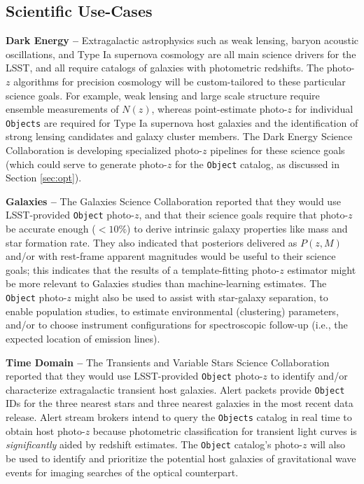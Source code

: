 \documentclass[DM,lsstdraft,toc]{lsstdoc}
\begin{document}
\subsection{Scientific Use-Cases}\label{ssec:use_sci}

{\bf Dark Energy --} Extragalactic astrophysics such as weak lensing, baryon acoustic oscillations, and Type Ia supernova cosmology are all main science drivers for the LSST, and all require catalogs of galaxies with photometric redshifts.
The photo-$z$ algorithms for precision cosmology will be custom-tailored to these particular science goals.
For example, weak lensing and large scale structure require ensemble measurements of $N(z)$, whereas point-estimate photo-$z$ for individual {\tt Objects} are required for Type Ia supernova host galaxies and the identification of strong lensing candidates and galaxy cluster members. 
The Dark Energy Science Collaboration is developing specialized photo-$z$ pipelines for these science goals (which could serve to generate photo-$z$ for the {\tt Object} catalog, as discussed in Section \ref{sec:opt}).

{\bf Galaxies --} The Galaxies Science Collaboration reported that they would use LSST-provided {\tt Object} photo-$z$, and that their science goals require that photo-$z$ be accurate enough ($<10\%$) to derive intrinsic galaxy properties like mass and star formation rate.
They also indicated that posteriors delivered as $P(z,M)$ and/or with rest-frame apparent magnitudes would be useful to their science goals; this indicates that the results of a template-fitting photo-$z$ estimator might be more relevant to Galaxies studies than machine-learning estimates.
The {\tt Object} photo-$z$ might also be used to assist with star-galaxy separation, to enable population studies, to estimate environmental (clustering) parameters, and/or to choose instrument configurations for spectroscopic follow-up (i.e., the expected location of emission lines).

{\bf Time Domain --} The Transients and Variable Stars Science Collaboration reported that they would use LSST-provided {\tt Object} photo-$z$ to identify and/or characterize extragalactic transient host galaxies.
Alert packets provide {\tt Object} IDs for the three nearest stars and three nearest galaxies in the most recent data release.
Alert stream brokers intend to query the {\tt Objects} catalog in real time to obtain host photo-$z$ because photometric classification for transient light curves is {\it significantly} aided by redshift estimates.
The {\tt Object} catalog's photo-$z$ will also be used to identify and prioritize the potential host galaxies of gravitational wave events for imaging searches of the optical counterpart.
\end{document}
